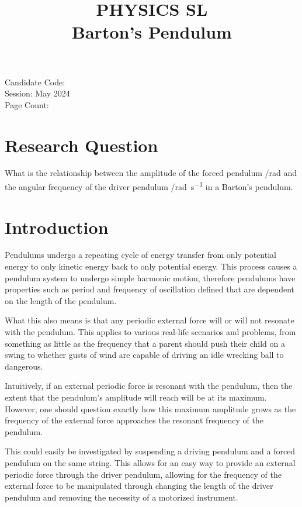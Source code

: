 \documentclass[letterpaper, 12pt]{article}
\title{PHYSICS SL
\\
Barton's Pendulum}
\author{}
\date{}
\begin{document}
\nocite{*}

\maketitle
\begin{center}
    Candidate Code:
    \\
    Session: May 2024
    \\
    Page Count:
\end{center}
\newpage

\tableofcontents
\newpage

\setcounter{page}{1}

\section{Research Question}

What is the relationship between the amplitude of
the forced pendulum /\unit{rad} and the
angular frequency of the driver pendulum /\unit{rad.s^{-1}} in a Barton's pendulum.

\section{Introduction}

Pendulums undergo a repeating cycle of energy transfer from
only potential energy to only kinetic energy back to
only potential energy. This process causes
a pendulum system to undergo simple harmonic motion,
therefore pendulums have properties such as
period and frequency of oscillation defined
that are dependent on the length of the pendulum.

What this also means is that any periodic
external force will or will not resonate with
the pendulum. This applies to various real-life
scenarios and problems, from something as little
as the frequency that a parent should push
their child on a swing to whether gusts
of wind are capable of driving an idle wrecking ball
to dangerous.

Intuitively, if an external periodic force
is resonant with the pendulum, then the extent
that the pendulum's amplitude will reach
will be at its maximum. However, one should question exactly
how this maximum amplitude grows as the frequency
of the external force approaches the resonant frequency
of the pendulum.

This could easily be investigated by suspending
a driving pendulum and a forced pendulum on
the same string. This allows for an easy way
to provide an external periodic force through
the driver pendulum, allowing for the frequency
of the external force to be manipulated through
changing the length of the driver pendulum and
removing the necessity of a motorized
instrument.
\end{document}
